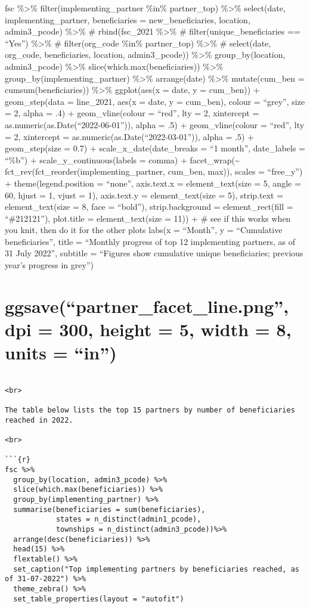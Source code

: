 \documentclass[
]{article}
\begin{document}
fsc \%\textgreater\% filter(implementing\_partner \%in\% partner\_top)
\%\textgreater\% select(date, implementing\_partner, beneficiaries =
new\_beneficiaries, location, admin3\_pcode) \%\textgreater\% \#
rbind(fsc\_2021 \%\textgreater\% \# filter(unique\_beneficiaries ==
``Yes'') \%\textgreater\% \# filter(org\_code \%in\% partner\_top)
\%\textgreater\% \# select(date, org\_code, beneficiaries, location,
admin3\_pcode)) \%\textgreater\% group\_by(location, admin3\_pcode)
\%\textgreater\% slice(which.max(beneficiaries)) \%\textgreater\%
group\_by(implementing\_partner) \%\textgreater\% arrange(date)
\%\textgreater\% mutate(cum\_ben = cumsum(beneficiaries))
\%\textgreater\% ggplot(aes(x = date, y = cum\_ben)) + geom\_step(data =
line\_2021, aes(x = date, y = cum\_ben), colour = ``grey'', size = 2,
alpha = .4) + geom\_vline(colour = ``red'', lty = 2, xintercept =
as.numeric(as.Date(``2022-06-01'')), alpha = .5) + geom\_vline(colour =
``red'', lty = 2, xintercept = as.numeric(as.Date(``2022-03-01'')),
alpha = .5) + geom\_step(size = 0.7) + scale\_x\_date(date\_breaks = ``1
month'', date\_labels = ``\%b'') + scale\_y\_continuous(labels = comma)
+ facet\_wrap(\textasciitilde{}
fct\_rev(fct\_reorder(implementing\_partner, cum\_ben, max)), scales =
``free\_y'') + theme(legend.position = ``none'', axis.text.x =
element\_text(size = 5, angle = 60, hjust = 1, vjust = 1), axis.text.y =
element\_text(size = 5), strip.text = element\_text(size = 8, face =
``bold''), strip.background = element\_rect(fill = ``\#212121''),
plot.title = element\_text(size = 11)) + \# see if this works when you
knit, then do it for the other plots labs(x = ``Month'', y =
``Cumulative beneficiaries'', title = ``Monthly progress of top 12
implementing partners, as of 31 July 2022'', subtitle = ``Figures show
cumulative unique beneficiaries; previous year's progress in grey'')

\hypertarget{ggsavepartner_facet_line.png-dpi-300-height-5-width-8-units-in}{%
\section{ggsave(``partner\_facet\_line.png'', dpi = 300, height = 5,
width = 8, units =
``in'')}\label{ggsavepartner_facet_line.png-dpi-300-height-5-width-8-units-in}}

\begin{verbatim}

<br>

The table below lists the top 15 partners by number of beneficiaries reached in 2022.

<br>

```{r}
fsc %>%
  group_by(location, admin3_pcode) %>% 
  slice(which.max(beneficiaries)) %>% 
  group_by(implementing_partner) %>% 
  summarise(beneficiaries = sum(beneficiaries), 
            states = n_distinct(admin1_pcode), 
            townships = n_distinct(admin3_pcode))%>%
  arrange(desc(beneficiaries)) %>% 
  head(15) %>% 
  flextable() %>% 
  set_caption("Top implementing partners by beneficiaries reached, as of 31-07-2022") %>%
  theme_zebra() %>% 
  set_table_properties(layout = "autofit")
\end{verbatim}
\end{document}
